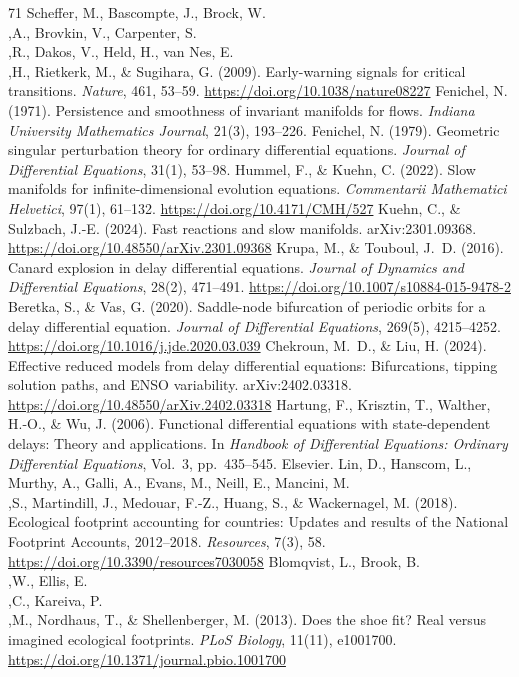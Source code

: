 \documentclass[twocolumn,10pt]{article}
\begin{document}
\begin{thebibliography}{71}
 Scheffer, M., Bascompte, J., Brock, W.\\,A., Brovkin, V., Carpenter, S.\\,R., Dakos, V., Held, H., van Nes, E.\\,H., Rietkerk, M., \& Sugihara, G. (2009). Early-warning signals for critical transitions. \textit{Nature}, 461, 53--59. \url{https://doi.org/10.1038/nature08227}
 Fenichel, N. (1971). Persistence and smoothness of invariant manifolds for flows. \textit{Indiana University Mathematics Journal}, 21(3), 193--226.
 Fenichel, N. (1979). Geometric singular perturbation theory for ordinary differential equations. \textit{Journal of Differential Equations}, 31(1), 53--98.
 Hummel, F., \& Kuehn, C. (2022). Slow manifolds for infinite-dimensional evolution equations. \textit{Commentarii Mathematici Helvetici}, 97(1), 61--132. \url{https://doi.org/10.4171/CMH/527}
 Kuehn, C., \& Sulzbach, J.-E. (2024). Fast reactions and slow manifolds. arXiv:2301.09368. \url{https://doi.org/10.48550/arXiv.2301.09368}
 Krupa, M., \& Touboul, J.~D. (2016). Canard explosion in delay differential equations. \textit{Journal of Dynamics and Differential Equations}, 28(2), 471--491. \url{https://doi.org/10.1007/s10884-015-9478-2}
 Beretka, S., \& Vas, G. (2020). Saddle-node bifurcation of periodic orbits for a delay differential equation. \textit{Journal of Differential Equations}, 269(5), 4215--4252. \url{https://doi.org/10.1016/j.jde.2020.03.039}
 Chekroun, M.~D., \& Liu, H. (2024). Effective reduced models from delay differential equations: Bifurcations, tipping solution paths, and ENSO variability. arXiv:2402.03318. \url{https://doi.org/10.48550/arXiv.2402.03318}
 Hartung, F., Krisztin, T., Walther, H.-O., \& Wu, J. (2006). Functional differential equations with state-dependent delays: Theory and applications. In \textit{Handbook of Differential Equations: Ordinary Differential Equations}, Vol.~3, pp.~435--545. Elsevier.
 Lin, D., Hanscom, L., Murthy, A., Galli, A., Evans, M., Neill, E., Mancini, M.\\,S., Martindill, J., Medouar, F.-Z., Huang, S., \& Wackernagel, M. (2018). Ecological footprint accounting for countries: Updates and results of the National Footprint Accounts, 2012--2018. \textit{Resources}, 7(3), 58. \url{https://doi.org/10.3390/resources7030058}
 Blomqvist, L., Brook, B.\\,W., Ellis, E.\\,C., Kareiva, P.\\,M., Nordhaus, T., \& Shellenberger, M. (2013). Does the shoe fit? Real versus imagined ecological footprints. \textit{PLoS Biology}, 11(11), e1001700. \url{https://doi.org/10.1371/journal.pbio.1001700}

\end{thebibliography}
\end{document}
